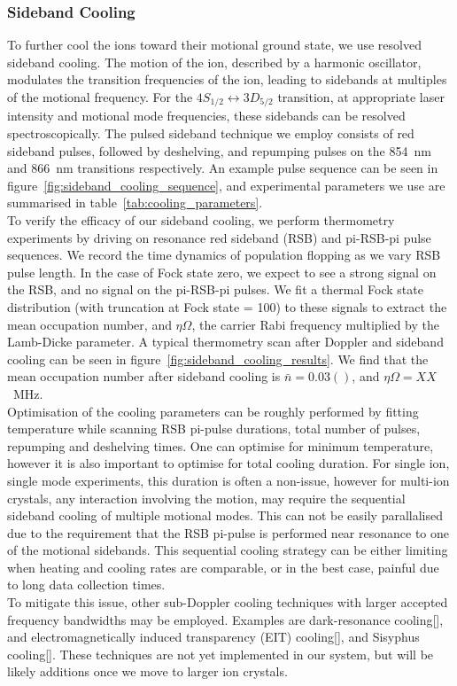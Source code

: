 \documentclass[12pt]{report}
\begin{document}
    \subsubsection{Sideband Cooling}

    To further cool the ions toward their motional ground state, we use resolved
    sideband cooling. The motion of the ion, described by a harmonic oscillator,
    modulates the transition frequencies of the ion, leading to sidebands at
    multiples of the motional frequency. For the $4S_{1/2} \leftrightarrow
    3D_{5/2}$ transition, at appropriate laser intensity and motional mode
    frequencies, these sidebands can be resolved spectroscopically. The pulsed
    sideband technique we employ consists of red sideband pulses, followed by
    deshelving, and repumping pulses on the 854~nm and 866~nm transitions
    respectively. An example pulse sequence can be seen in
    figure~\ref{fig:sideband_cooling_sequence}, and experimental parameters we use are summarised in table~\ref{tab:cooling_parameters}.\\
    To verify the efficacy of our sideband cooling, we perform thermometry
    experiments by driving on resonance red sideband (RSB) and pi-RSB-pi pulse
    sequences. We record the time dynamics of population flopping as we vary RSB
    pulse length. In the case of Fock state zero, we expect to see a strong
    signal on the RSB, and no signal on the pi-RSB-pi pulses. We fit a thermal
    Fock state distribution (with truncation at Fock state = 100) to these
    signals to extract the mean occupation number, and $\eta\Omega$, the carrier
    Rabi frequency multiplied by the Lamb-Dicke parameter. A typical thermometry
    scan after Doppler and sideband cooling can be seen in
    figure~\ref{fig:sideband_cooling_results}. We find that the mean occupation
    number after sideband cooling is $\bar{n} = 0.03()$, and $\eta\Omega =
    XX$~MHz.\\
    Optimisation of the cooling parameters can be roughly performed by fitting
    temperature while scanning RSB pi-pulse durations, total number of pulses,
    repumping and deshelving times. One can optimise for minimum temperature,
    however it is also important to optimise for total cooling duration. For
    single ion, single mode experiments, this duration is often a non-issue,
    however for multi-ion crystals, any interaction involving the motion, may
    require the sequential sideband cooling of multiple motional modes. This can
    not be easily parallalised due to the requirement that the RSB pi-pulse is
    performed near resonance to one of the motional sidebands. This sequential
    cooling strategy can be either limiting when heating and cooling rates are
    comparable, or in the best case, painful due to long data collection times.\\
    To mitigate this issue, other sub-Doppler cooling techniques with larger
    accepted frequency bandwidths may be employed. Examples are dark-resonance
    cooling[], and electromagnetically induced transparency (EIT) cooling[], and
    Sisyphus cooling[]. These techniques are not yet implemented in our system,
    but will be likely additions once we move to larger ion crystals.\\
\end{document}
